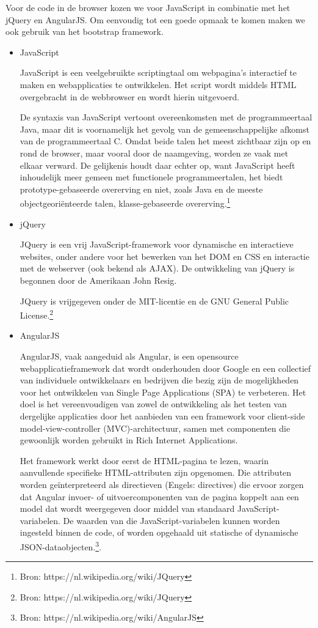 \documentclass[11pt,twoside,a4paper]{article}
\begin{document}
	Voor de code in de browser kozen we voor JavaScript in combinatie met het jQuery en AngularJS. Om eenvoudig tot een goede opmaak te komen maken we ook gebruik van het bootstrap framework.
	
	\begin{itemize}
	
	\item JavaScript
	
	JavaScript is een veelgebruikte scriptingtaal om webpagina's interactief te maken en webapplicaties te ontwikkelen. Het script wordt middels HTML overgebracht in de webbrowser en wordt hierin uitgevoerd.

De syntaxis van JavaScript vertoont overeenkomsten met de programmeertaal Java, maar dit is voornamelijk het gevolg van de gemeenschappelijke afkomst van de programmeertaal C. Omdat beide talen het meest zichtbaar zijn op en rond de browser, maar vooral door de naamgeving, worden ze vaak met elkaar verward. De gelijkenis houdt daar echter op, want JavaScript heeft inhoudelijk meer gemeen met functionele programmeertalen, het biedt prototype-gebaseerde overerving en niet, zoals Java en de meeste objectgeori\"enteerde talen, klasse-gebaseerde overerving.\footnote{Bron: https://nl.wikipedia.org/wiki/JQuery}	
	
	\item jQuery

JQuery is een vrij JavaScript-framework voor dynamische en interactieve websites, onder andere voor het bewerken van het DOM en CSS en interactie met de webserver (ook bekend als AJAX). De ontwikkeling van jQuery is begonnen door de Amerikaan John Resig.

JQuery is vrijgegeven onder de MIT-licentie en de GNU General Public License.\footnote{Bron: https://nl.wikipedia.org/wiki/JQuery}
	
	\item AngularJS
	
AngularJS, vaak aangeduid als Angular, is een opensource webapplicatieframework dat wordt onderhouden door Google en een collectief van individuele ontwikkelaars en bedrijven die bezig zijn de mogelijkheden voor het ontwikkelen van Single Page Applications (SPA) te verbeteren. Het doel is het vereenvoudigen van zowel de ontwikkeling als het testen van dergelijke applicaties door het aanbieden van een framework voor client-side model-view-controller (MVC)-architectuur, samen met componenten die gewoonlijk worden gebruikt in Rich Internet Applications.

Het framework werkt door eerst de HTML-pagina te lezen, waarin aanvullende specifieke HTML-attributen zijn opgenomen. Die attributen worden geïnterpreteerd als directieven (Engels: directives) die ervoor zorgen dat Angular invoer- of uitvoercomponenten van de pagina koppelt aan een model dat wordt weergegeven door middel van standaard JavaScript-variabelen. De waarden van die JavaScript-variabelen kunnen worden ingesteld binnen de code, of worden opgehaald uit statische of dynamische JSON-dataobjecten.\footnote{Bron: https://nl.wikipedia.org/wiki/AngularJS}.
	

\end{itemize}
\end{document}
